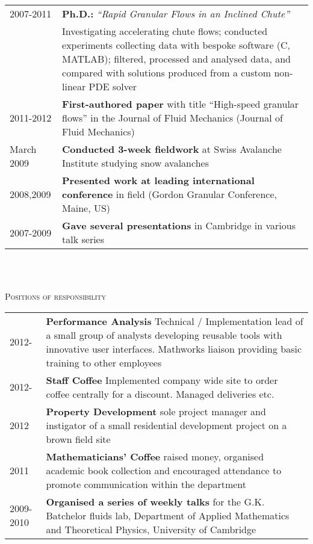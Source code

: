 \documentclass[a4paper,10pt]{article}
\newcommand{\lineunder}{\vspace*{0.2cm} \\ \hspace*{-20pt} \hrulefill \\ \vspace{-0.9cm}}
\newcommand{\header}[1]{{\hspace*{-17pt}\vspace*{6pt} \large{\textsc{#1}}}}
\begin{document}
\begin{tabular}{p{0.8in}p{5.3in}}
2007-2011 & \textbf{Ph.D.:} \textit{``Rapid Granular Flows in an Inclined Chute''}  \\
 & Investigating accelerating chute flows; conducted experiments collecting data with bespoke software (C, MATLAB); filtered, processed and analysed data, and compared with solutions produced from a custom non-linear PDE solver \\
2011-2012 & \textbf{First-authored paper} with title ``High-speed granular flows'' in the Journal of Fluid Mechanics (Journal of Fluid Mechanics) \\
March 2009 & \textbf{Conducted 3-week fieldwork} at Swiss Avalanche Institute studying snow avalanches \\
2008,2009 & \textbf{Presented work at leading international conference} in field (Gordon Granular Conference, Maine, US) \\
2007-2009 & \textbf{Gave several presentations} in Cambridge in various talk series \\

\end{tabular}
\newline
\lineunder



\header{Positions of responsibility}

\begin{tabular}{p{0.8in}p{5.3in}}
2012- & \textbf{Performance Analysis} Technical / Implementation lead of a small group of analysts developing reusable tools with innovative user interfaces. Mathworks liaison providing basic training to other employees\\ 
2012- & \textbf{Staff Coffee} Implemented company wide site to order coffee centrally for a discount. Managed deliveries etc.\\
2012      & \textbf{Property Development} sole project manager and instigator of a small residential development project on a brown field site\\
2011      & \textbf{Mathematicians' Coffee} raised money, organised academic book collection and encouraged attendance to promote communication within the department\\
2009-2010 & \textbf{Organised a series of weekly talks} for the G.K. Batchelor fluids lab, Department of Applied Mathematics and Theoretical Physics, University of Cambridge \\
\end{tabular}
\newline
\lineunder
\end{document}
